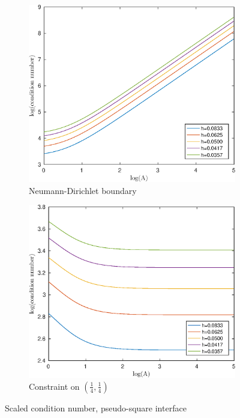 \documentclass[12pt]{article}
\begin{document}
\begin{figure}[h!]
\vfill
\begin{subfigure}{0.4\textwidth}
\includegraphics[width=\textwidth]{cond-A-2D-pcircular-ND}
\caption{Neumann-Dirichlet boundary}
\end{subfigure}
\hfill
\begin{subfigure}{0.4\textwidth}
\includegraphics[width=\textwidth]{cond-A-2D-pcircular-interface}
\caption{Constraint on $(\frac{1}{4},\frac{1}{4})$}
\end{subfigure}
\caption{Scaled condition number, pseudo-square interface}
\end{figure}
\end{document}
